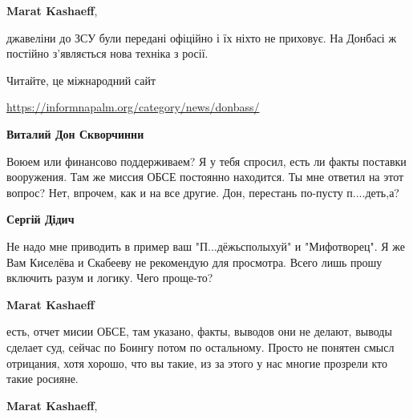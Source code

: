 \begin{itemize}
\begin{itemize}
\textbf{Marat Kashaeff}, 

джавеліни до ЗСУ були передані офіційно і їх ніхто не приховує. На Донбасі ж
постійно з'являється нова техніка з росії.

Читайте, це міжнародний сайт

\url{https://informnapalm.org/category/news/donbass/}

 
\textbf{Виталий Дон Скворчинни} 

Воюем или финансово поддерживаем? Я у тебя спросил, есть ли факты поставки
вооружения. Там же миссия ОБСЕ постоянно находится. Ты мне ответил на этот
вопрос? Нет, впрочем, как и на все другие. Дон, перестань по-пусту п....деть,а?


 
\textbf{Сергій Дідич} 

Не надо мне приводить в пример ваш "П...дёжьсполыхуй" и "Мифотворец". Я же Вам
Киселёва и Скабееву не рекомендую для просмотра. Всего лишь прошу включить
разум и логику. Чего проще-то?


 
\textbf{Marat Kashaeff} 

есть, отчет мисии ОБСЕ, там указано, факты, выводов они не делают, выводы
сделает суд, сейчас по Боингу потом по остальному. Просто не понятен смысл
отрицания, хотя хорошо, что вы такие, из за этого у нас многие прозрели кто
такие росияне.

 
\textbf{Marat Kashaeff},


\end{itemize}
\end{itemize}
